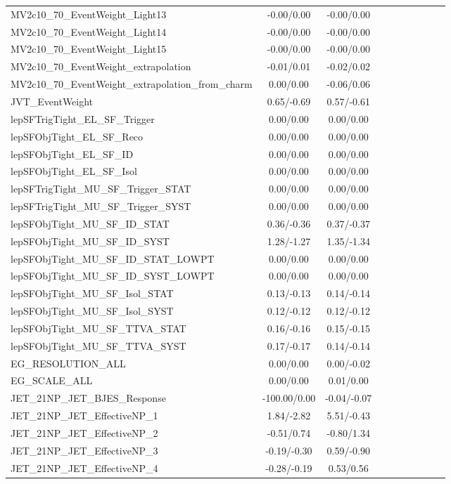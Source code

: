 \begin{table}[h]
\begin{center}
\begin{tabular}{l|ccccccccc}
MV2c10\_70\_EventWeight\_Light13 &-0.00/0.00 &-0.00/0.00 \\
MV2c10\_70\_EventWeight\_Light14 &-0.00/0.00 &-0.00/0.00 \\
MV2c10\_70\_EventWeight\_Light15 &-0.00/0.00 &-0.00/0.00 \\
MV2c10\_70\_EventWeight\_extrapolation &-0.01/0.01 &-0.02/0.02 \\
MV2c10\_70\_EventWeight\_extrapolation\_from\_charm &0.00/0.00 &-0.06/0.06 \\
JVT\_EventWeight &0.65/-0.69 &0.57/-0.61 \\
lepSFTrigTight\_EL\_SF\_Trigger &0.00/0.00 &0.00/0.00 \\
lepSFObjTight\_EL\_SF\_Reco &0.00/0.00 &0.00/0.00 \\
lepSFObjTight\_EL\_SF\_ID &0.00/0.00 &0.00/0.00 \\
lepSFObjTight\_EL\_SF\_Isol &0.00/0.00 &0.00/0.00 \\
lepSFTrigTight\_MU\_SF\_Trigger\_STAT &0.00/0.00 &0.00/0.00 \\
lepSFTrigTight\_MU\_SF\_Trigger\_SYST &0.00/0.00 &0.00/0.00 \\
lepSFObjTight\_MU\_SF\_ID\_STAT &0.36/-0.36 &0.37/-0.37 \\
lepSFObjTight\_MU\_SF\_ID\_SYST &1.28/-1.27 &1.35/-1.34 \\
lepSFObjTight\_MU\_SF\_ID\_STAT\_LOWPT &0.00/0.00 &0.00/0.00 \\
lepSFObjTight\_MU\_SF\_ID\_SYST\_LOWPT &0.00/0.00 &0.00/0.00 \\
lepSFObjTight\_MU\_SF\_Isol\_STAT &0.13/-0.13 &0.14/-0.14 \\
lepSFObjTight\_MU\_SF\_Isol\_SYST &0.12/-0.12 &0.12/-0.12 \\
lepSFObjTight\_MU\_SF\_TTVA\_STAT &0.16/-0.16 &0.15/-0.15 \\
lepSFObjTight\_MU\_SF\_TTVA\_SYST &0.17/-0.17 &0.14/-0.14 \\
EG\_RESOLUTION\_ALL &0.00/0.00 &0.00/-0.02 \\
EG\_SCALE\_ALL &0.00/0.00 &0.01/0.00 \\
JET\_21NP\_JET\_BJES\_Response &-100.00/0.00 &-0.04/-0.07 \\
JET\_21NP\_JET\_EffectiveNP\_1 &1.84/-2.82 &5.51/-0.43 \\
JET\_21NP\_JET\_EffectiveNP\_2 &-0.51/0.74 &-0.80/1.34 \\
JET\_21NP\_JET\_EffectiveNP\_3 &-0.19/-0.30 &0.59/-0.90 \\
JET\_21NP\_JET\_EffectiveNP\_4 &-0.28/-0.19 &0.53/0.56 \\

\end{tabular}
\end{center}
\end{table}
